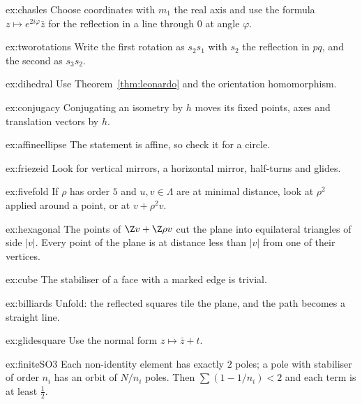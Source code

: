\begin{hint}{ex:chasles}
Choose coordinates with $m_1$ the real axis and use the formula $z\mapsto e^{2i\varphi}\bar z$ for the reflection in a line through $0$
at angle $\varphi$.
\end{hint}
\begin{hint}{ex:tworotations}
Write the first rotation as $s_2s_1$ with $s_2$ the reflection in $pq$, and the second as $s_3s_2$.
\end{hint}
\begin{hint}{ex:dihedral}
Use Theorem~\ref{thm:leonardo} and the orientation homomorphism.
\end{hint}
\begin{hint}{ex:conjugacy}
Conjugating an isometry by $h$ moves its fixed points, axes and translation vectors by $h$.
\end{hint}
\begin{hint}{ex:affineellipse}
The statement is affine, so check it for a circle.
\end{hint}
\begin{hint}{ex:friezeid}
Look for vertical mirrors, a horizontal mirror, half-turns and glides.
\end{hint}
\begin{hint}{ex:fivefold}
If $\rho$ has order $5$ and $u,v\in\Lambda$ are at minimal distance, look at $\rho^2$ applied around a point, or at $v+\rho^2v$.
\end{hint}
\begin{hint}{ex:hexagonal}
The points of $\Z v+\Z\rho v$ cut the plane into equilateral triangles of side $|v|$. Every point of the plane is at distance less than
$|v|$ from one of their vertices.
\end{hint}
\begin{hint}{ex:cube}
The stabiliser of a face with a marked edge is trivial.
\end{hint}
\begin{hint}{ex:billiards}
Unfold: the reflected squares tile the plane, and the path becomes a straight line.
\end{hint}
\begin{hint}{ex:glidesquare}
Use the normal form $z\mapsto\bar z+t$.
\end{hint}
\begin{hint}{ex:finiteSO3}
Each non-identity element has exactly $2$ poles; a pole with stabiliser of order $n_i$ has an orbit of $N/n_i$ poles. Then
$\sum(1-1/n_i)<2$ and each term is at least $\frac12$.
\end{hint}

